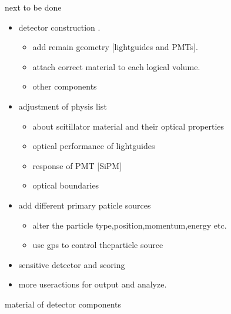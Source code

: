 \documentclass[11pt,compress,xcolor=x11names,UTF8]{beamer}
\begin{document}
\begin{frame}{next to be done}
\begin{itemize}
\item detector construction \alert{.}
\begin{itemize}
\item add remain geometry [lightguides and PMTs].
\item attach correct material to each logical volume.
\item other components
\end{itemize}
\item adjustment of physis list 
\begin{itemize}
\item  about scitillator material and their \alert{optical properties}
\item  optical performance of lightguides
\item  response of PMT [SiPM]
\item optical boundaries
\end{itemize}

\item add different primary \alert{paticle sources}\\
\begin{itemize}
\item alter the particle type,position,momentum,energy etc.\\
\item  use gps to control theparticle source
\end{itemize}
\item sensitive detector and scoring 
\item more useractions for output and analyze.
\end{itemize}
\end{frame}
\begin{frame}{ material of detector components}
\end{frame}
\end{document}
